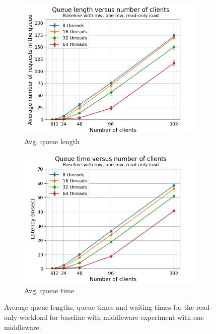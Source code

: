 \documentclass[11pt,a4paper]{article}
\begin{document}
\begin{figure}[h]
\centering
\begin{subfigure}{.5\textwidth}
  \centering
  \includegraphics[width=1.0\linewidth,trim={5px 0px 20px 0px},clip]{img/plot/mwb1-ro-qlen_mw.png}
  \caption{Avg. queue length}
  \label{fig:mwb1-ro-qlen_mw}
\end{subfigure}%
\begin{subfigure}{.5\textwidth}
  \centering
  \includegraphics[width=1.0\linewidth,trim={5px 0px 20px 0px},clip]{img/plot/mwb1-ro-qtime_mw.png}
  \caption{Avg. queue time}
  \label{fig:mwb1-ro-qtime_mw}
\end{subfigure}
\caption{Average queue lengths, queue times and waiting times for the read-only workload for baseline with middleware experiment with one middleware.}
\label{fig:mwb1-ro-qstats}
\end{figure}
\end{document}

